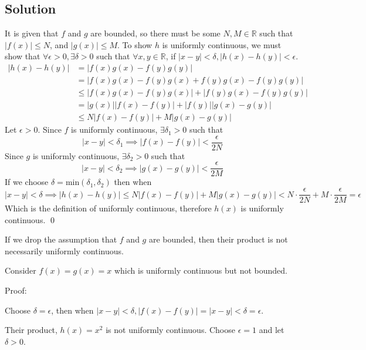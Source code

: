 \documentclass{article}
\begin{document}
\subsection{Solution}
It is given that $f$ and $g$ are bounded, so there must be some $N,M \in \mathbb{R}$ such that $|f(x)|\le N$, and $|g(x)|\le M$. To show $h$ is
uniformly continuous, we must show that $\forall \epsilon > 0, \exists \delta >0$ such that $\forall x,y \in \mathbb{R}$, if $|x-y|<\delta, |h(x)-h(y)|<\epsilon$.
\begin{align*}
	|h(x)-h(y)| & = |f(x)g(x)-f(y)g(y)|                         \\[0.5em]
	            & = |f(x)g(x) - f(y)g(x) + f(y)g(x) - f(y)g(y)| \\[0.5em]
	            & \le |f(x)g(x)-f(y)g(x)| + |f(y)g(x)-f(y)g(y)| \\[0.5em]
	            & = |g(x)||f(x)-f(y)| + |f(y)||g(x)-g(y)|       \\[0.5em]
	            & \le N|f(x)-f(y)|+M|g(x)-g(y)|
\end{align*}
Let $\epsilon>0$. Since $f$ is uniformly continuous, $\exists \delta_1 >0$ such that
\begin{equation*}
	|x-y| < \delta_1 \implies |f(x)-f(y)|<\dfrac{\epsilon}{2N}
\end{equation*}
Since $g$ is uniformly continuous, $\exists \delta_2 >0$ such that
\begin{equation*}
	|x-y| < \delta_2 \implies |g(x)-g(y)|<\dfrac{\epsilon}{2M}
\end{equation*}
If we choose $\delta = \text{min}(\delta_1,\delta_2)$ then when
\begin{equation*}
	|x-y| < \delta \implies |h(x)-h(y)| \le N|f(x)-f(y)|+M|g(x)-g(y)| < N \cdot \dfrac{\epsilon}{2N} + M \cdot \dfrac{\epsilon}{2M}=\epsilon
\end{equation*}
Which is the definition of uniformly continuous, therefore $h(x)$ is uniformly continuous. \qed

If we drop the assumption that $f$ and $g$ are bounded, then their product is not necessarily uniformly continuous.

Consider $f(x)=g(x)=x$ which is uniformly continuous but not bounded.

Proof:

Choose $\delta = \epsilon$, then when $|x-y|<\delta, |f(x)-f(y)| = |x-y| < \delta = \epsilon$.

Their product, $h(x)=x^2$ is not uniformly continuous. Choose $\epsilon=1$ and let $\delta>0$.
\end{document}
